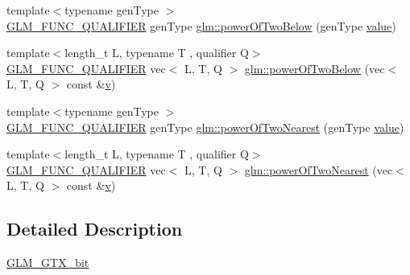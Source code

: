 \begin{DoxyCompactItemize}
\item 
{\footnotesize template$<$typename gen\+Type $>$ }\\\hyperlink{setup_8hpp_a33fdea6f91c5f834105f7415e2a64407}{G\+L\+M\+\_\+\+F\+U\+N\+C\+\_\+\+Q\+U\+A\+L\+I\+F\+I\+ER} gen\+Type \hyperlink{namespaceglm_a895c5bb540f5f52ef2b7a81321a98627}{glm\+::power\+Of\+Two\+Below} (gen\+Type \hyperlink{_s_d_l__opengl__glext_8h_a8ad81492d410ff2ac11f754f4042150f}{value})
\item 
{\footnotesize template$<$length\+\_\+t L, typename T , qualifier Q$>$ }\\\hyperlink{setup_8hpp_a33fdea6f91c5f834105f7415e2a64407}{G\+L\+M\+\_\+\+F\+U\+N\+C\+\_\+\+Q\+U\+A\+L\+I\+F\+I\+ER} vec$<$ L, T, Q $>$ \hyperlink{group__gtx__bit_gaf78ddcc4152c051b2a21e68fecb10980}{glm\+::power\+Of\+Two\+Below} (vec$<$ L, T, Q $>$ const \&\hyperlink{_s_d_l__opengl_8h_a10a82eabcb59d2fcd74acee063775f90}{v})
\item 
{\footnotesize template$<$typename gen\+Type $>$ }\\\hyperlink{setup_8hpp_a33fdea6f91c5f834105f7415e2a64407}{G\+L\+M\+\_\+\+F\+U\+N\+C\+\_\+\+Q\+U\+A\+L\+I\+F\+I\+ER} gen\+Type \hyperlink{namespaceglm_a90d716367872062cffce4a8cd51acd0c}{glm\+::power\+Of\+Two\+Nearest} (gen\+Type \hyperlink{_s_d_l__opengl__glext_8h_a8ad81492d410ff2ac11f754f4042150f}{value})
\item 
{\footnotesize template$<$length\+\_\+t L, typename T , qualifier Q$>$ }\\\hyperlink{setup_8hpp_a33fdea6f91c5f834105f7415e2a64407}{G\+L\+M\+\_\+\+F\+U\+N\+C\+\_\+\+Q\+U\+A\+L\+I\+F\+I\+ER} vec$<$ L, T, Q $>$ \hyperlink{group__gtx__bit_gac87e65d11e16c3d6b91c3bcfaef7da0b}{glm\+::power\+Of\+Two\+Nearest} (vec$<$ L, T, Q $>$ const \&\hyperlink{_s_d_l__opengl_8h_a10a82eabcb59d2fcd74acee063775f90}{v})
\end{DoxyCompactItemize}


\subsection{Detailed Description}
\hyperlink{group__gtx__bit}{G\+L\+M\+\_\+\+G\+T\+X\+\_\+bit} 